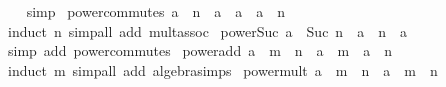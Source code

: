 \begin{isabellebody}
%
\isadelimproof
\ \ %
\endisadelimproof
%
\isatagproof
{}\isamarkupfalse%
\ simp%
\endisatagproof
{\isafoldproof}%
%
\isadelimproof
\isanewline
%
\endisadelimproof
\isanewline
{}\isamarkupfalse%
\ power{\isacharunderscore}{\kern0pt}commutes{\isacharcolon}{\kern0pt}\ {\isachardoublequoteopen}a\ {\isacharcircum}{\kern0pt}\ n\ {\isacharasterisk}{\kern0pt}\ a\ {\isacharequal}{\kern0pt}\ a\ {\isacharasterisk}{\kern0pt}\ a\ {\isacharcircum}{\kern0pt}\ n{\isachardoublequoteclose}\isanewline
%
\isadelimproof
\ \ %
\endisadelimproof
%
\isatagproof
{}\isamarkupfalse%
\ {\isacharparenleft}{\kern0pt}induct\ n{\isacharparenright}{\kern0pt}\ {\isacharparenleft}{\kern0pt}simp{\isacharunderscore}{\kern0pt}all\ add{\isacharcolon}{\kern0pt}\ mult{\isachardot}{\kern0pt}assoc{\isacharparenright}{\kern0pt}%
\endisatagproof
{\isafoldproof}%
%
\isadelimproof
\isanewline
%
\endisadelimproof
\isanewline
{}\isamarkupfalse%
\ power{\isacharunderscore}{\kern0pt}Suc{}{\isacharcolon}{\kern0pt}\ {\isachardoublequoteopen}a\ {\isacharcircum}{\kern0pt}\ Suc\ n\ {\isacharequal}{\kern0pt}\ a\ {\isacharcircum}{\kern0pt}\ n\ {\isacharasterisk}{\kern0pt}\ a{\isachardoublequoteclose}\isanewline
%
\isadelimproof
\ \ %
\endisadelimproof
%
\isatagproof
{}\isamarkupfalse%
\ {\isacharparenleft}{\kern0pt}simp\ add{\isacharcolon}{\kern0pt}\ power{\isacharunderscore}{\kern0pt}commutes{\isacharparenright}{\kern0pt}%
\endisatagproof
{\isafoldproof}%
%
\isadelimproof
\isanewline
%
\endisadelimproof
\isanewline
{}\isamarkupfalse%
\ power{\isacharunderscore}{\kern0pt}add{\isacharcolon}{\kern0pt}\ {\isachardoublequoteopen}a\ {\isacharcircum}{\kern0pt}\ {\isacharparenleft}{\kern0pt}m\ {\isacharplus}{\kern0pt}\ n{\isacharparenright}{\kern0pt}\ {\isacharequal}{\kern0pt}\ a\ {\isacharcircum}{\kern0pt}\ m\ {\isacharasterisk}{\kern0pt}\ a\ {\isacharcircum}{\kern0pt}\ n{\isachardoublequoteclose}\isanewline
%
\isadelimproof
\ \ %
\endisadelimproof
%
\isatagproof
{}\isamarkupfalse%
\ {\isacharparenleft}{\kern0pt}induct\ m{\isacharparenright}{\kern0pt}\ {\isacharparenleft}{\kern0pt}simp{\isacharunderscore}{\kern0pt}all\ add{\isacharcolon}{\kern0pt}\ algebra{\isacharunderscore}{\kern0pt}simps{\isacharparenright}{\kern0pt}%
\endisatagproof
{\isafoldproof}%
%
\isadelimproof
\isanewline
%
\endisadelimproof
\isanewline
{}\isamarkupfalse%
\ power{\isacharunderscore}{\kern0pt}mult{\isacharcolon}{\kern0pt}\ {\isachardoublequoteopen}a\ {\isacharcircum}{\kern0pt}\ {\isacharparenleft}{\kern0pt}m\ {\isacharasterisk}{\kern0pt}\ n{\isacharparenright}{\kern0pt}\ {\isacharequal}{\kern0pt}\ {\isacharparenleft}{\kern0pt}a\ {\isacharcircum}{\kern0pt}\ m{\isacharparenright}{\kern0pt}\ {\isacharcircum}{\kern0pt}\ n{\isachardoublequoteclose}\isanewline

\end{isabellebody}
